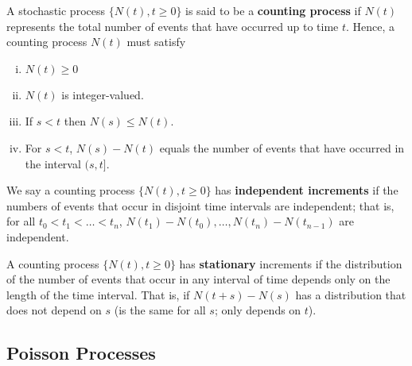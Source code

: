\begin{definition}A stochastic process \(\{N(t), t \geq 0\}\) is said to be a \textbf{counting process} if \(N(t)\) represents the total number of events that have occurred up to time \(t\). Hence, a counting process \(N(t)\) must satisfy

\begin{enumerate}[(i)]

\item \(N(t) \geq 0\)

\item \(N(t)\) is integer-valued.

\item If \(s <t\) then \(N(s) \leq N(t)\).

\item For \(s < t\), \(N(s) -N(t)\) equals the number of events that have occurred in the interval \((s, t]\).

\end{enumerate}

\end{definition}

\begin{definition} We say a counting process \(\{N(t), t\geq0\}\) has \textbf{independent increments} if the numbers of events that occur in disjoint time intervals are independent; that is, for all \(t_0 < t_1 < \ldots < t_n\), \(  N(t_1) - N(t_0), \ldots, N(t_n) - N(t_{n-1})\) are independent. 

\end{definition}

\begin{definition}\label{stoch.stationary.increments.def} A counting process \(\{N(t) , t \geq 0 \}\) has \textbf{stationary} increments if the distribution of the number of events that occur in any interval of time depends only on the length of the time interval. That is, if \(N(t+s) - N(s)\) has a distribution that does not depend on \(s\) (is the same for all \(s\); only depends on \(t\)).

\end{definition}

\subsection{Poisson Processes}\label{stoch.pois.proc.sec}

